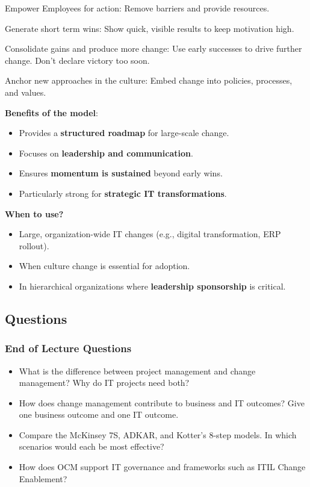 \step Empower Employees for action: Remove barriers and provide resources.

\step Generate short term wins: Show quick, visible results to keep motivation high.

\step Consolidate gains and produce more change: Use early successes to drive further change. Don’t declare victory too soon.

\step Anchor new approaches in the culture: Embed change into policies, processes, and values.

\bigskip

\noindent\textbf{Benefits of the model}:

\begin{itemize}
    \item Provides a \textbf{structured roadmap} for large-scale change.
    \item Focuses on \textbf{leadership and communication}.
    \item Ensures \textbf{momentum is sustained} beyond early wins.
    \item Particularly strong for \textbf{strategic IT transformations}.
\end{itemize}

\bigskip

\noindent\textbf{When to use?}

\begin{itemize}
    \item Large, organization-wide IT changes (e.g., digital transformation, ERP rollout).
    \item When culture change is essential for adoption.
    \item In hierarchical organizations where \textbf{leadership sponsorship} is critical.
\end{itemize}

\subsection{Questions}

\subsubsection{End of Lecture Questions}

\begin{itemize}
    \item What is the difference between project management and change management? Why do IT projects need both?
    \item How does change management contribute to business and IT outcomes? Give one business outcome and one IT outcome.
    \item Compare the McKinsey 7S, ADKAR, and Kotter’s 8-step models. In which scenarios would each be most effective?
    \item How does OCM support IT governance and frameworks such as ITIL Change Enablement?
\end{itemize}

